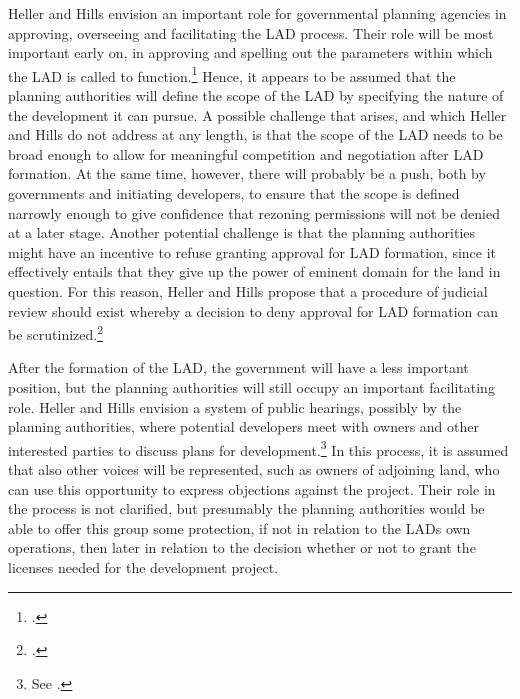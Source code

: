 Heller and Hills envision an important role for governmental planning agencies in approving, overseeing and facilitating the LAD process. Their role will be most important early on, in approving and spelling out the parameters within which the LAD is called to function.\footcite[1489-1491]{heller08} Hence, it appears to be assumed that the planning authorities will define the scope of the LAD by specifying the nature of the development it can pursue. A possible challenge that arises, and which Heller and Hills do not address at any length, is that the scope of the LAD needs to be broad enough to allow for meaningful competition and negotiation after LAD formation. At the same time, however, there will probably be a push, both by governments and initiating developers, to ensure that the scope is defined narrowly enough to give confidence that rezoning permissions will not be denied at a later stage. Another potential challenge is that the planning authorities might have an incentive to refuse granting approval for LAD formation, since it effectively entails that they give up the power of eminent domain for the land in question. For this reason, Heller and Hills propose that a procedure of judicial review should exist whereby a decision to deny approval for LAD formation can be scrutinized.\footcite[1490]{heller08} 

After the formation of the LAD, the government will have a less important position, but the planning authorities will still occupy an important facilitating role. Heller and Hills envision a system of public hearings, possibly  by the planning authorities, where potential developers meet with owners and other interested parties to discuss  plans for development.\footnote{See \cite[1490-1491]{heller08}.} In this process, it is assumed that also other voices will be represented, such as owners of adjoining land, who can use this opportunity to express objections against the project. Their role in the process is not clarified, but presumably the planning authorities would be able to offer this group some protection, if not in relation to the LADs own operations, then later in relation to the decision whether or not to grant the licenses needed for the development project.

